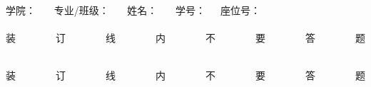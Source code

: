 \newcommand{\pagenumstyle}{%
\ifthenelse{\boolean{twopagenum}}{%
	\pagestyle{fancy}
	\renewcommand{\headrulewidth}{0pt}
	\fancyfoot[CO,CE]{共~\the\numexpr2*\getpagerefnumber{mylastpage}\relax~页~~~~第~\the\numexpr2*\value{page}-1\relax~页~~\hspace*{.4\linewidth}共~\the\numexpr2*\getpagerefnumber{mylastpage}\relax~页~~~~第~\the\numexpr2*\value{page}\relax~页}
	\ifthenelse{\boolean{printanswers}}
	{
	}
	{
	\fancyhead[RE]{\leavevmode\vbox to0pt{
			\vss\rlap{\putzdxx }\vskip -26cm }}%
	\fancyhead[LO]{\leavevmode\vbox to0pt{
			\vss\rlap{\putzdx }\vskip -26cm }} %
	}
}
{%
\pagestyle{fancy}
\renewcommand{\headrulewidth}{0pt}
\fancyfoot[CO,CE]{第~\thepage~页~~共~\pageref{LastPage}~页}
\ifthenelse{\boolean{printanswers}}
{
}
{
\fancyhead[RE]{\leavevmode\vbox to0pt{
		\vss\rlap{\putzdxx }\vskip -26cm }} %
\fancyhead[LO]{\leavevmode\vbox to0pt{
		\vss\rlap{\putzdx }\vskip -26cm }} %
}
}
}
\newsavebox{\zdxa}
\sbox{\zdxa}
{\parbox{27cm}{\centering {}\songti \hspace{1cm}
		学院：\underline{\makebox[28mm][c]{}}~~~ 专业/班级：\underline{\makebox[28mm][c]{}}~~~ 姓名：\underline{\makebox[28mm][c]{}}~~~ 学号：\underline{\makebox[28mm][c]{}}~~~座位号：\underline{\makebox[10mm][c]{}} \\
		\vspace{-1mm}
		\songti
		\dotfill\\
		\vspace{-1mm}%
		装~~~~~~~~订~~~~~~~~线~~~~~~~~内~~~~~~~~不~~~~~~~~要~~~~~~~~答~~~~~~~~题\\
		\vspace{-3mm}%
\dotfill
}
}
\newsavebox{\zdxb}
\sbox{\zdxb}
{\parbox{27cm}{\centering%
		\songti
		\dotfill\\
		\vspace{-1mm}%
		装~~~~~~~~订~~~~~~~~线~~~~~~~~内~~~~~~~~不~~~~~~~~要~~~~~~~~答~~~~~~~~题\\
		\vspace{-3mm}%
		\dotfill
}
}
\newsavebox{\zdxc}
